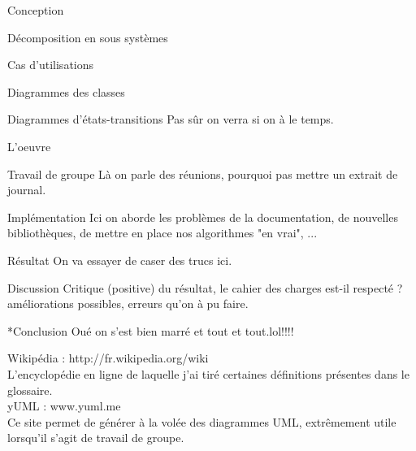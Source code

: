 \documentclass[a4paper, 12pt]{report}
\begin{document}
	\begin{part}{Conception}
		\begin{chapter}{Décomposition en sous systèmes}
		
		\end{chapter}
		\begin{chapter}{Cas d'utilisations}
		
		\end{chapter}
		\begin{chapter}{Diagrammes des classes}
		
		\end{chapter}
		\begin{chapter}{Diagrammes d'états-transitions}
			Pas sûr on verra si on à le temps.
		\end{chapter}
	\end{part}
	\begin{part}{L'oeuvre}
		\begin{chapter}{Travail de groupe}
			Là on parle des réunions, pourquoi pas mettre un extrait de journal.
		\end{chapter}
		\begin{chapter}{Implémentation}
			Ici on aborde les problèmes de la documentation, de nouvelles bibliothèques, de mettre en place nos algorithmes "en vrai", ... 
		\end{chapter}
		\begin{chapter}{Résultat}
			On va essayer de caser des trucs ici.
		\end{chapter}
		\begin{chapter}{Discussion}
			Critique (positive) du résultat, le cahier des charges est-il respecté ? améliorations possibles, erreurs qu'on à pu faire.
		\end{chapter}
	\end{part}
	\begin{chapter}*{Conclusion}
		Oué on s'est bien marré et tout et tout.lol!!!!
	\end{chapter}
	\renewcommand\glossaryname{Glossaire}
	\printglossaries
	\listoffigures
	\renewcommand\bibname{Sitographie}%
	\begin{thebibliography}{2}
		Wikipédia : http://fr.wikipedia.org/wiki\\
		L'encyclopédie en ligne de laquelle j'ai tiré certaines définitions présentes dans le glossaire.
		~\\
		yUML : www.yuml.me \\
		Ce site permet de générer à la volée des diagrammes \gls{UML}, extrêmement utile lorsqu'il s'agit de travail de groupe.
	\end{thebibliography}
\end{document}

